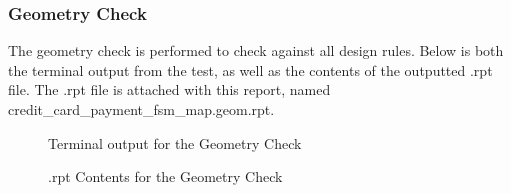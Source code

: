 \documentclass[12pt]{article}
\begin{document}
\subsubsection{Geometry Check} %
The geometry check is performed to check against all design rules. Below is both the terminal output from the test, as well as the contents of the outputted .rpt file. The .rpt file is attached with this report, named credit\_card\_payment\_fsm\_map.geom.rpt.
\begin{figure} [H]
    \centering
    \caption{Terminal output for the Geometry Check}
\end{figure}

\begin{figure} [H]
    \centering
    \caption{.rpt Contents for the Geometry Check}
\end{figure}
\end{document}
